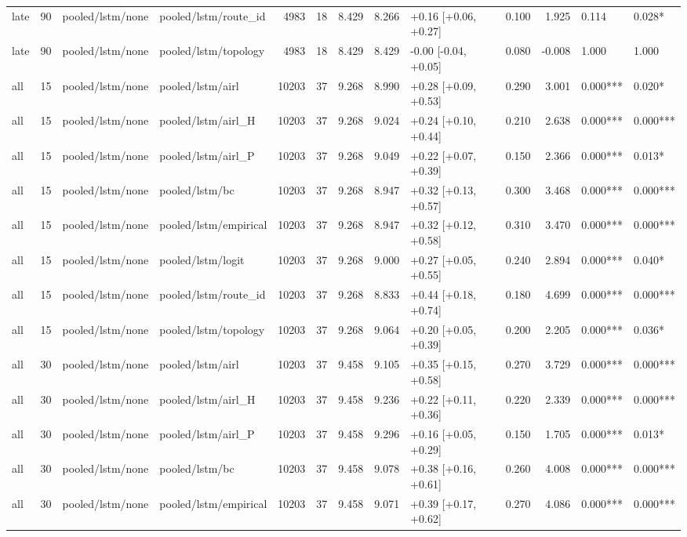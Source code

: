 \begin{tabular}{lrllrrrrlrrll}
late & 90 & pooled/lstm/none & pooled/lstm/route_id & 4983 & 18 & 8.429 & 8.266 & +0.16 [+0.06, +0.27] & 0.100 & 1.925 & 0.114 & 0.028* \\
late & 90 & pooled/lstm/none & pooled/lstm/topology & 4983 & 18 & 8.429 & 8.429 & -0.00 [-0.04, +0.05] & 0.080 & -0.008 & 1.000 & 1.000 \\
all & 15 & pooled/lstm/none & pooled/lstm/airl & 10203 & 37 & 9.268 & 8.990 & +0.28 [+0.09, +0.53] & 0.290 & 3.001 & 0.000*** & 0.020* \\
all & 15 & pooled/lstm/none & pooled/lstm/airl_H & 10203 & 37 & 9.268 & 9.024 & +0.24 [+0.10, +0.44] & 0.210 & 2.638 & 0.000*** & 0.000*** \\
all & 15 & pooled/lstm/none & pooled/lstm/airl_P & 10203 & 37 & 9.268 & 9.049 & +0.22 [+0.07, +0.39] & 0.150 & 2.366 & 0.000*** & 0.013* \\
all & 15 & pooled/lstm/none & pooled/lstm/bc & 10203 & 37 & 9.268 & 8.947 & +0.32 [+0.13, +0.57] & 0.300 & 3.468 & 0.000*** & 0.000*** \\
all & 15 & pooled/lstm/none & pooled/lstm/empirical & 10203 & 37 & 9.268 & 8.947 & +0.32 [+0.12, +0.58] & 0.310 & 3.470 & 0.000*** & 0.000*** \\
all & 15 & pooled/lstm/none & pooled/lstm/logit & 10203 & 37 & 9.268 & 9.000 & +0.27 [+0.05, +0.55] & 0.240 & 2.894 & 0.000*** & 0.040* \\
all & 15 & pooled/lstm/none & pooled/lstm/route_id & 10203 & 37 & 9.268 & 8.833 & +0.44 [+0.18, +0.74] & 0.180 & 4.699 & 0.000*** & 0.000*** \\
all & 15 & pooled/lstm/none & pooled/lstm/topology & 10203 & 37 & 9.268 & 9.064 & +0.20 [+0.05, +0.39] & 0.200 & 2.205 & 0.000*** & 0.036* \\
all & 30 & pooled/lstm/none & pooled/lstm/airl & 10203 & 37 & 9.458 & 9.105 & +0.35 [+0.15, +0.58] & 0.270 & 3.729 & 0.000*** & 0.000*** \\
all & 30 & pooled/lstm/none & pooled/lstm/airl_H & 10203 & 37 & 9.458 & 9.236 & +0.22 [+0.11, +0.36] & 0.220 & 2.339 & 0.000*** & 0.000*** \\
all & 30 & pooled/lstm/none & pooled/lstm/airl_P & 10203 & 37 & 9.458 & 9.296 & +0.16 [+0.05, +0.29] & 0.150 & 1.705 & 0.000*** & 0.013* \\
all & 30 & pooled/lstm/none & pooled/lstm/bc & 10203 & 37 & 9.458 & 9.078 & +0.38 [+0.16, +0.61] & 0.260 & 4.008 & 0.000*** & 0.000*** \\
all & 30 & pooled/lstm/none & pooled/lstm/empirical & 10203 & 37 & 9.458 & 9.071 & +0.39 [+0.17, +0.62] & 0.270 & 4.086 & 0.000*** & 0.000*** \\

\end{tabular}
